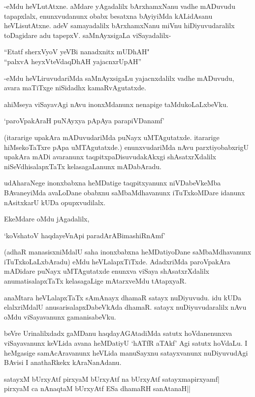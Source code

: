-eMdu heVLutAtxne. aMdare yAgadalilx bArxhamxNanu vadhe mADuvudu tapapxlalx, enunxvudanunx obabx besatxna bAyiyiMda kALidAsanu heVLisutAtxne. adeV samayadalilx bArxhamxNanu miVnu hiDiyuvudaralilx toDagidare adu tapepxV. saMnAyxsigaLa viSayadalilx-

\begin{shloka}
``Etatf sherxVyoV yeVBi nanadxnitx mUDhAH"\\
``palxvA heyxVteV\s daqDhAH yajacnxrUpAH''
\end{shloka}

-eMdu heVLiruvudariMda saMnAyxsigaLu yajacnxdalilx vadhe mADuvudu, avara maTiTxge niSidadhx kamaRvAgutatxde.

ahiMseya viSayavAgi nAvu inonxMdanunx nenapige taMdukoLaLxbeVku.

\begin{shloka}
`paroVpakAraH puNAyxya pApAya parapiVDanamf'
\end{shloka}

(itararige upakAra mADuvudariMda puNayx uMTAgutatxde. itararige hiMsekoTaTxre pApa uMTAgutatxde.) enunxvudariMda nAvu parxtiyobabxrigU upakAra mADi avaranunx taqpitxpaDisuvudakAkxgi shAsatxrXdalilx niSeVdhisalapxTaTx kelasagaLanunx mADabAradu.

udAharaNege inonxbabxna heMDatige taqpitxyanunx niVDabeVkeMba BAvaneyiMda avaLoDane obabxnu saMbaMdhavanunx iTuTxkoMDare idanunx nAsitxkarU kUDa opupxvudilalx.

EkeMdare oMdu jAgadalilx,

\begin{shloka}
`koVshatoV haqdayeVnApi paradArABimashiRnAmf'
\end{shloka}

(adhaR manasisxniMdalU saha inonxbabxna heMDatiyoDane saMbaMdhavanunx iTuTxkoLaLxbAradu) eMdu heVLalapxTiTxde. AdadxriMda paroVpakAra mADidare puNayx uMTAgutatxde enunxva viSaya shAsatxrXdalilx anumatisalapxTaTx kelasagaLige mAtarxveMdu tAtapxyaR.

anaMtara heVLalapxTaTx sAmAnayx dhamaR satayx nuDiyuvudu. idu kUDa elalxriMdalU anusarisalapxDabeVkAda dhamaR. satayx nuDiyuvudaralilx nAvu oMdu viSayavanunx gamanisabeVku.

beVre Urinalilxdadx gaMDanu haqdayAGAtadiMda satutx hoVdanenunxva viSayavanunx keVLida avana heMDatiyU `hATfR aTAkf' Agi satutx hoVdaLu. I heMgasige samAcAravanunx heVLida manuSayxnu satayxvanunx nuDiyuvudAgi BAvisi I anathaRkekx kAraNanAdanu.

\begin{shloka}
satayxM bUrxyAtf pirxyaM bUrxyAtf na bUrxyAtf satayxmapirxyamf|\\
pirxyaM ca nAnaqtaM bUrxyAtf ESa dhamaRH sanAtanaH||
\end{shloka}

